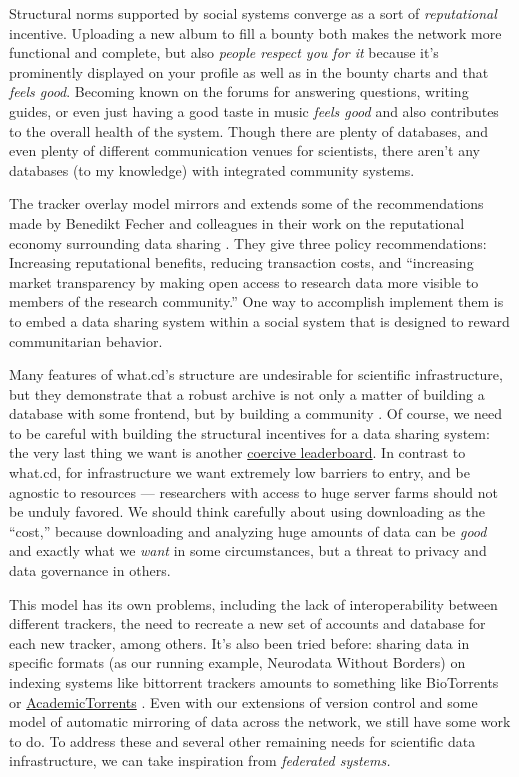 \documentclass[notoc]{tufte-book}
\begin{document}
Structural norms supported by social systems converge as a sort of
\emph{reputational} incentive. Uploading a new album to fill a bounty
both makes the network more functional and complete, but also
\emph{people respect you for it} because it's prominently displayed on
your profile as well as in the bounty charts and that \emph{feels good}.
Becoming known on the forums for answering questions, writing guides, or
even just having a good taste in music \emph{feels good} and also
contributes to the overall health of the system. Though there are plenty
of databases, and even plenty of different communication venues for
scientists, there aren't any databases (to my knowledge) with integrated
community systems.

The tracker overlay model mirrors and extends some of the
recommendations made by Benedikt Fecher and colleagues in their work on
the reputational economy surrounding data sharing \citep{fecherReputationEconomyHow2017} . They give three policy
recommendations: Increasing reputational benefits, reducing transaction
costs, and ``increasing market transparency by making open access to
research data more visible to members of the research community.'' One
way to accomplish implement them is to embed a data sharing system
within a social system that is designed to reward communitarian
behavior.

Many features of what.cd's structure are undesirable for scientific
infrastructure, but they demonstrate that a robust archive is not only a
matter of building a database with some frontend, but by building a
community \citep{brossCommunityCollaborationContribution2013} . Of
course, we need to be careful with building the structural incentives
for a data sharing system: the very last thing we want is another
\href{https://etiennelebel.com/cs/t-leaderboard/t-leaderboard.html}{coercive
leaderboard}. In contrast to what.cd, for infrastructure we want
extremely low barriers to entry, and be agnostic to resources ---
researchers with access to huge server farms should not be unduly
favored. We should think carefully about using downloading as the
``cost,'' because downloading and analyzing huge amounts of data can be
\emph{good} and exactly what we \emph{want} in some circumstances, but a
threat to privacy and data governance in others.

This model has its own problems, including the lack of interoperability
between different trackers, the need to recreate a new set of accounts
and database for each new tracker, among others. It's also been tried
before: sharing data in specific formats (as our running example,
Neurodata Without Borders) on indexing systems like bittorrent trackers
amounts to something like BioTorrents \citep{langilleBioTorrentsFileSharing2010}  or
\href{https://academictorrents.com/}{AcademicTorrents} \citep{cohenAcademicTorrentsCommunityMaintained2014} . Even with our
extensions of version control and some model of automatic mirroring of
data across the network, we still have some work to do. To address these
and several other remaining needs for scientific data infrastructure, we
can take inspiration from \emph{federated systems.}
\end{document}
